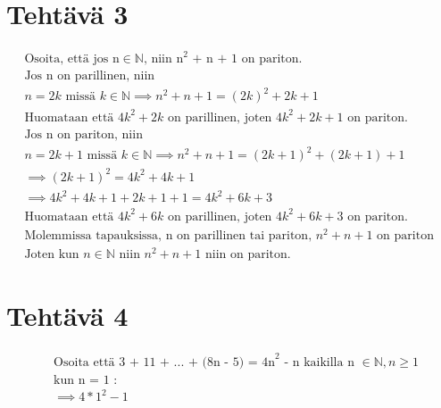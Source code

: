 \documentclass{article}
\begin{document}
	\section*{Tehtävä 3}
    \[
        \begin{aligned}
            \text{Osoita, että jos n} \in \mathbb{N} \text{, niin n}^2 \text{ + n + 1 on pariton.} \\[5pt]
            \text{Jos n on parillinen, niin } \\
            n = 2k \text{ missä } k \in \mathbb{N} \implies n^2 + n + 1 = (2k)^2 + 2k + 1 \\
            \text{Huomataan että } 4k^2 + 2k \text{ on parillinen, joten } 4k^2 + 2k + 1 \text{ on pariton.} \\[10pt]
            \text{Jos n on pariton, niin } \\
            n = 2k + 1 \text{ missä } k \in \mathbb{N} \implies  n^2 + n + 1 = (2k + 1)^2 + (2k + 1) + 1 \\
            \implies (2k + 1)^2 = 4k^2 + 4k + 1 \\
            \implies 4k^2 + 4k + 1 + 2k + 1 + 1 = 4k^2 + 6k + 3 \\
            \text{Huomataan että } 4k^2 + 6k \text{ on parillinen, joten } 4k^2 + 6k + 3 \text{ on pariton.} \\[20pt]
            \text{Molemmissa tapauksissa, n on parillinen tai pariton, } n^2 + n + 1 \text{ on pariton } \\
            \text{Joten kun } n \in \mathbb{N} \text{ niin } n^2 + n + 1 \text{ niin on pariton.}
        \end{aligned}
    \]
    \newpage
	\section*{Tehtävä 4}
    \[
        \begin{aligned}
            &\text{Osoita että 3 + 11 + ... + (8n - 5) = 4n}^2 \text{ - n kaikilla n } \in \mathbb{N}, n \geq 1 \\[15pt]
            &\text{kun n = 1 :} \\
            &\implies 4 * 1^2 - 1 \\
        \end{aligned}
    \]
\end{document}
